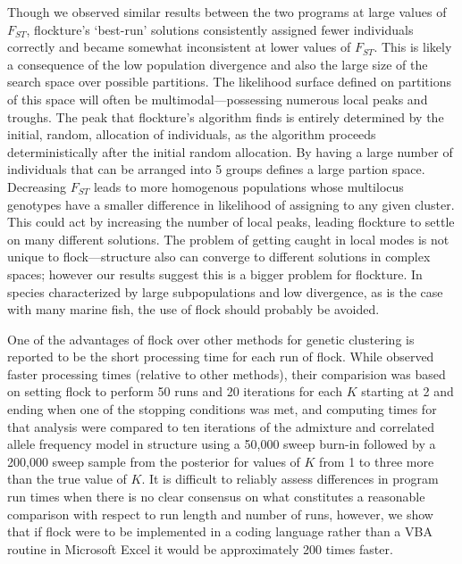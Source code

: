 Though we observed similar results
between the two programs at large values of $F_{ST}$, 
{\sc flockture}'s `best-run' solutions consistently assigned fewer individuals correctly
and became somewhat inconsistent at lower values of $F_{ST}$.
This is likely a consequence of the low population divergence and also
the large size of the search space over possible partitions. 
The likelihood surface defined on partitions of this space will often
be multimodal---possessing numerous local peaks and troughs.
The peak that  {\sc flockture}'s algorithm finds is entirely determined by the initial, random, allocation of 
individuals, as the algorithm proceeds deterministically after the initial random allocation.
By having a large number of individuals
that can be arranged into 5 groups defines a large partion space.
Decreasing $F_{ST}$ leads to more homogenous 
populations whose multilocus genotypes have a smaller difference in 
likelihood of assigning to any given cluster. This could act by increasing the number of
local peaks, leading {\sc flockture} to settle on many different solutions. The problem of getting 
caught in local modes is not unique to {\sc flock}---{\sc structure} also can converge to 
different solutions in complex spaces; however our results suggest this is a bigger problem for {\sc flockture}.
In species characterized by large subpopulations and low divergence, as is the case with many 
marine fish, the use of {\sc flock} should probably be avoided.
   
One of the advantages of {\sc flock} over other methods for genetic clustering
is reported to be the short processing time for each run of {\sc flock}.
While \citet{Duc&Tur2012} observed faster processing times (relative to other methods), 
their comparision was based on setting {\sc flock} to perform 50 runs and 20 iterations for each 
$K$ starting at 2 and ending when one of the stopping conditions was met, and computing times for that analysis 
were compared to ten iterations of the admixture and correlated allele frequency model in {\sc structure} using 
a 50,000 sweep burn-in followed by a 200,000 sweep sample 
from the posterior for values of $K$ from 1 to three more than the true 
value of $K$. It is difficult to reliably assess differences in program run times when there is no clear consensus on what 
constitutes a reasonable comparison with respect to run length and number of runs, however, we show that if 
{\sc flock} were to be implemented in a coding language rather than a VBA routine in Microsoft Excel
it would be approximately 200 times faster.

